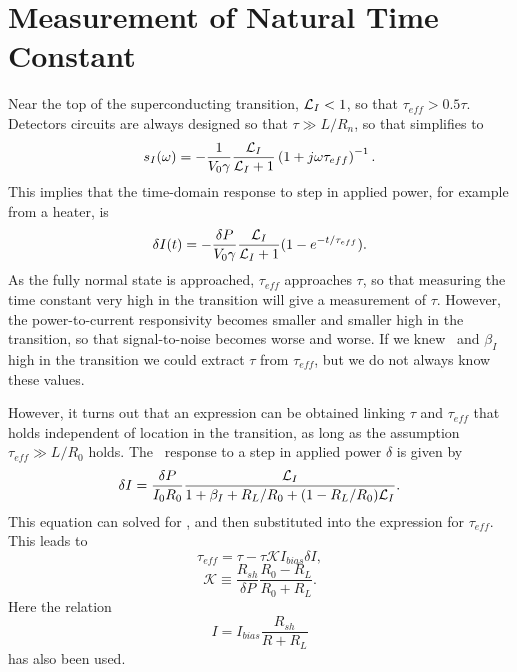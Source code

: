 \section{Measurement of Natural Time Constant}

Near the top of the superconducting transition, $\mathcal{L}_I < 1$, so that $\tau_{eff} > 0.5 \tau$.
Detectors circuits are always designed so that $\tau \gg L/R_n$, so that  simplifies to
\begin{equation} \label{eqn:htr-step-resp-high}
s_I(\omega) = - \frac{1}{V_0 \gamma}\frac{\mathcal{L}_I}{\mathcal{L}_I + 1}
                       \left(1 + j \omega \tau_{eff}\right)^{-1}.
\end{equation}
This implies that the time-domain response to step in applied power, for example from a heater, is
\begin{equation}
\delta I(t) = - \frac{\delta P}{V_0 \gamma}\frac{\mathcal{L}_I}{\mathcal{L}_I + 1}
                (1 - e^{-t/\tau_{eff}}).
\end{equation}
As the fully normal state is approached, $\tau_{eff}$ approaches $\tau$, so that measuring the time constant very high in the transition will give a measurement of $\tau$.
However, the power-to-current  responsivity becomes smaller and smaller high in the transition, so that signal-to-noise becomes worse and worse.
If we knew \Loop\ and $\beta_I$ high in the transition we could extract $\tau$ from $\tau_{eff}$, but we do not always know these values.

However, it turns out that an expression can be obtained linking $\tau$ and $\tau_{eff}$ that holds independent of location in the transition, as long as the assumption $\tau_{eff} \gg L/R_0$ holds.
The \DC\ response to a step in applied power $\delta $ is given by
\begin{equation}
\delta I = \frac{\delta P}{I_0 R_0}\frac{\mathcal{L}_I}{1 + \beta_I + R_L/R_0 + (1 - R_L / R_0)\mathcal{L}_I}.
\end{equation}
This equation can solved for \Loop, and then substituted into the expression for $\tau_{eff}$.
This leads to
\begin{equation}\label{eqn:teff-from-tau}
\tau_{eff} = \tau - \tau \mathcal{K} I_{bias} \delta I,
\end{equation}
\begin{equation}
\mathcal{K} \equiv \frac{R_{sh}}{\delta P} \frac{R_0 - R_L}{R_0 + R_L}.
\end{equation}
Here the relation
\begin{equation}
I = I_{bias}\frac{R_{sh}}{R + R_L}
\end{equation}
has also been used.

